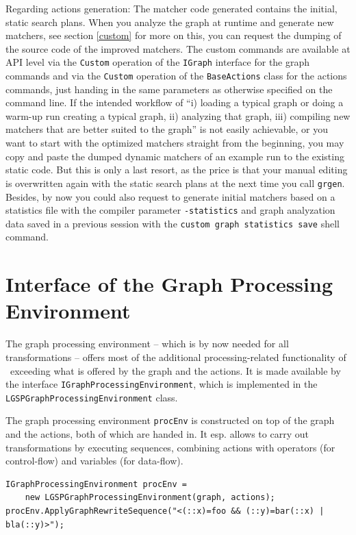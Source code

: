 Regarding actions generation:
The matcher code generated contains the initial, static search plans.
When you analyze the graph at runtime and generate new matchers, see section \ref{custom} for more on this, you can request the dumping of the source code of the improved matchers.
The custom commands are available at API level via the \texttt{Custom} operation of the \texttt{IGraph} interface for the graph commands and via the \texttt{Custom} operation of the \texttt{BaseActions} class for the actions commands, just handing in the same parameters as otherwise specified on the command line.
If the intended workflow of ``i) loading a typical graph or doing a warm-up run creating a typical graph, ii) analyzing that graph, iii) compiling new matchers that are better suited to the graph'' is not easily achievable, or you want to start with the optimized matchers straight from the beginning, you may copy and paste the dumped dynamic matchers of an example run to the existing static code. 
But this is only a last resort, as the price is that your manual editing is overwritten again with the static search plans at the next time you call \texttt{grgen}.
Besides, by now you could also request to generate initial matchers based on a statistics file with the compiler parameter \texttt{-statistics} and graph analyzation data saved in a previous session with the \texttt{custom graph statistics save} shell command.


\section{Interface of the Graph Processing Environment}\label{sec:procenv}

The graph processing environment -- which is by now needed for all transformations -- offers most of the additional processing-related functionality of \GrG~exceeding what is offered by the graph and the actions.
It is made available by the interface \texttt{IGraph\-Processing\-Environment}, which is implemented in the \texttt{LGSPGraph\-Processing\-Environment} class.

\begin{example}\label{ex:procenv}
The graph processing environment \texttt{procEnv} is constructed on top of the graph and the actions, both of which are handed in.
It esp. allows to carry out transformations by executing sequences, combining actions with operators (for control-flow) and variables (for data-flow).

\begin{verbatim}
IGraphProcessingEnvironment procEnv = 
    new LGSPGraphProcessingEnvironment(graph, actions);
procEnv.ApplyGraphRewriteSequence("<(::x)=foo && (::y)=bar(::x) | bla(::y)>");
\end{verbatim}
\end{example}

